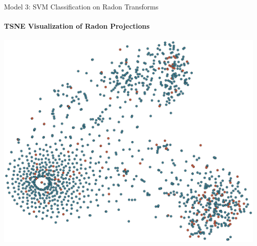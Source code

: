 \documentclass{beamer}
\begin{document}
\begin{frame}{Model 3: SVM Classification on Radon Transforms}
  \framesubtitle{TSNE Visualization of Radon Projections}

  \begin{center}
    \vspace*{-0.15cm}
  \includegraphics[scale=0.4]{img/tsne_Radon.eps}
  \end{center}

\end{frame}




\end{document}
